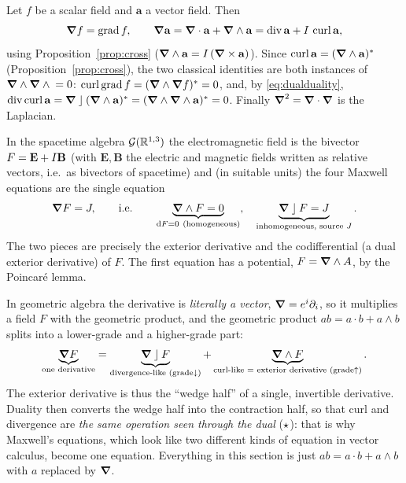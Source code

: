 \begin{example}
Let $f$ be a scalar field and $\mathbf a$ a vector field. Then
\[
 \boldsymbol{\nabla} f=\operatorname{grad}f,\qquad
 \boldsymbol{\nabla}\mathbf a=\boldsymbol{\nabla}\cdot\mathbf a+\boldsymbol{\nabla}\wedge\mathbf a=\operatorname{div}\mathbf a+I\,\operatorname{curl}\mathbf a ,
\]
using Proposition~\ref{prop:cross} ($\boldsymbol{\nabla}\wedge\mathbf a=I\,(\boldsymbol{\nabla}\times\mathbf a)$). Since $\operatorname{curl}\mathbf a=(\boldsymbol{\nabla}\wedge\mathbf a)^{\ast}$ (Proposition~\ref{prop:cross}), the two classical identities are both instances of $\boldsymbol{\nabla}\wedge\boldsymbol{\nabla}\wedge{}=0$: $\operatorname{curl}\operatorname{grad}f=(\boldsymbol{\nabla}\wedge\boldsymbol{\nabla} f)^{\ast}=0$, and, by \eqref{eq:dualduality},
$\operatorname{div}\operatorname{curl}\mathbf a=\boldsymbol{\nabla}\mathbin{\rfloor}(\boldsymbol{\nabla}\wedge\mathbf a)^{\ast}=(\boldsymbol{\nabla}\wedge\boldsymbol{\nabla}\wedge\mathbf a)^{\ast}=0$. Finally $\boldsymbol{\nabla}^2=\boldsymbol{\nabla}\cdot\boldsymbol{\nabla}$ is the Laplacian.
\end{example}

\begin{example}
In the spacetime algebra $\mathcal{G}(\mathbb{R}^{1,3})$ the electromagnetic field is the bivector $F=\mathbf E+I\mathbf B$ (with $\mathbf E,\mathbf B$ the electric and magnetic fields written as relative vectors, i.e.\ as bivectors of spacetime) and (in suitable units) the four Maxwell equations are the single equation
\[
 \vd F=J ,\qquad\text{i.e.}\qquad \underbrace{\vd\wedge F=0}_{\dd F=0\ (\text{homogeneous})},\quad
 \underbrace{\vd\lc F=J}_{\text{inhomogeneous, source }J}.
\]
The two pieces are precisely the exterior derivative and the codifferential (a dual exterior derivative) of $F$. The first equation has a potential, $F=\boldsymbol{\nabla}\wedge A$, by the Poincar\'e lemma.
\end{example}

\begin{intuition}
In geometric algebra the derivative is \emph{literally a vector}, $\boldsymbol{\nabla}=e^i\partial_i$, so it multiplies a field $F$ with the geometric product, and the geometric product $ab=a\cdot b+a\wedge b$ splits into a lower-grade and a higher-grade part:
\[
 \underbrace{\boldsymbol{\nabla} F}_{\text{one derivative}}=\underbrace{\boldsymbol{\nabla}\mathbin{\rfloor} F}_{\text{divergence-like (grade}\downarrow)}+\underbrace{\boldsymbol{\nabla}\wedge F}_{\text{curl-like = exterior derivative (grade}\uparrow)} .
\]
The exterior derivative is thus the ``wedge half'' of a single, invertible derivative. Duality then converts the wedge half into the contraction half, so that curl and divergence are \emph{the same operation seen through the dual} ($\star$): that is why Maxwell's equations, which look like two different kinds of equation in vector calculus, become one equation. Everything in this section is just $ab=a\cdot b+a\wedge b$ with $a$ replaced by $\boldsymbol{\nabla}$.
\end{intuition}
